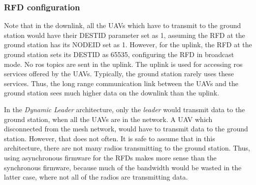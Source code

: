 \subsubsection{RFD configuration}
Note that in the downlink, all the UAVs which have to transmit to the ground station would have their DESTID parameter set as 1, assuming the RFD at the ground station has its NODEID set as 1. However, for the uplink, the RFD at the ground station sets its DESTID as 65535, configuring the RFD in broadcast mode. No ros topics are sent in the uplink. The uplink is used for accessing ros services offered by the UAVs. Typically, the ground station rarely uses these services. Thus, the long range communication link between the UAVs and the ground station sees much higher data on the downlink than the uplink.

In the \textit{Dynamic Leader} architecture, only the \textit{leader} would transmit data to the ground station, when all the UAVs are in the network. A UAV which disconnected from the mesh network, would have to transmit data to the ground station. However, that does not often. It is safe to assume that in this architecture, there are not many radios transmitting to the ground station. Thus, using asynchronous firmware for the RFDs makes more sense than the synchronous firmware, because much of the bandwidth would be wasted in the latter case, where not all of the radios are transmitting data.



